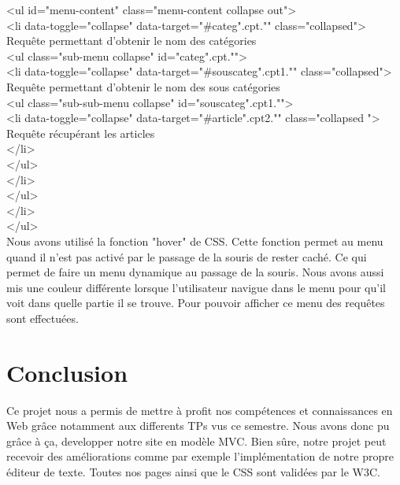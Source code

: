 \documentclass[hidelinks, 12pt,a4paper]{article}
\begin{document}
<ul id="menu-content" class="menu-content collapse out">\\
   <li data-toggle="collapse" data-target="\#categ".cpt."" class="collapsed">\\
      Requête permettant d'obtenir le nom des catégories\\
     <ul class="sub-menu collapse" id="categ".cpt."">\\
           <li data-toggle="collapse" data-target="\#souscateg".cpt1."" class="collapsed">\\
                Requête permettant d'obtenir le nom des sous catégories\\
                 <ul class="sub-sub-menu collapse" id="souscateg".cpt1."">\\
                    <li data-toggle="collapse" data-target="\#article".cpt2."" class="collapsed ">\\
                        Requête récupérant les articles\\
                    </li>\\
               </ul>\\
          </li>\\
        </ul>\\
    </li>\\
</ul>\\

Nous avons utilisé la fonction "hover" de CSS. Cette fonction permet au menu quand il n'est pas activé par le passage de la souris de rester caché. Ce qui permet de faire un menu dynamique au passage de la souris. Nous avons aussi mis une couleur différente lorsque l'utilisateur navigue dans le menu pour qu'il voit dans quelle partie il se trouve.
Pour pouvoir afficher ce menu des requêtes sont effectuées.

\newpage
\section{Conclusion}
Ce projet nous a permis de mettre à profit nos compétences et connaissances en Web grâce notamment aux differents TPs vus ce semestre. Nous avons donc pu grâce à ça, developper notre site en modèle MVC. Bien sûre, notre projet peut recevoir des améliorations comme par exemple l'implémentation de notre propre éditeur de texte. Toutes nos pages ainsi que le CSS sont validées par le W3C.
\end{document}
